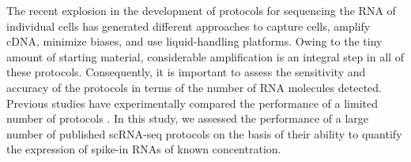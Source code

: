 The recent explosion in the development of protocols for sequencing the RNA of individual cells  \cite{Macaulay2014-iq, Stegle2015-qy} has generated different approaches to capture cells, amplify cDNA, minimize biases, and use liquid-handling platforms. Owing to the tiny amount of starting material, considerable amplification is an integral step in all of these protocols. Consequently, it is important to assess the sensitivity and accuracy of the protocols in terms of the number of RNA molecules detected. Previous studies have experimentally compared the performance of a limited number of protocols  \cite{Wu2014-ot, Ziegenhain2016-wc}. In this study, we assessed the performance of a large number of published scRNA-seq protocols on the basis of their ability to quantify the expression of spike-in RNAs of known concentration.

